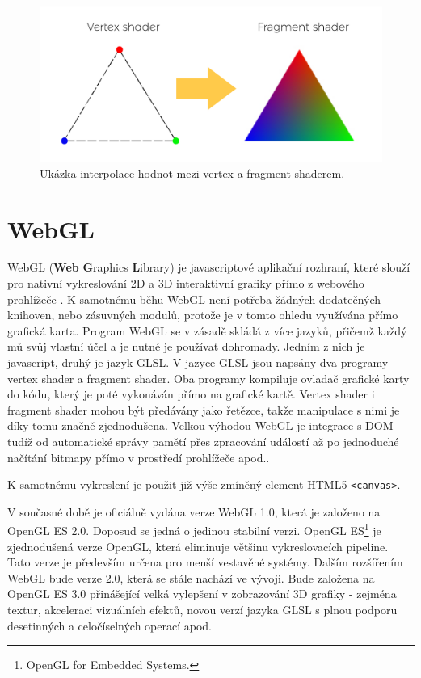  
\begin{figure}[h]
	\label{img:1}
	\centering
	\includegraphics[scale=1.0,angle=0,width=1.0\linewidth]{obrazky-figures/interpolace}
	\caption{Ukázka interpolace hodnot mezi vertex a fragment shaderem.}
	\label{fig:inter}
\end{figure}
 



\newpage

\section{WebGL}
WebGL (\textbf{Web} \textbf{G}raphics \textbf{L}ibrary) je javascriptové aplikační rozhraní, které slouží pro nativní vykreslování 2D a 3D interaktivní grafiky přímo z webového prohlížeče \cite{mozilla}. K samotnému běhu WebGL není potřeba žádných dodatečných knihoven, nebo zásuvných modulů, protože je v tomto ohledu využívána přímo grafická karta. Program WebGL se v zásadě skládá z více jazyků, přičemž každý mů svůj vlastní účel a je nutné je používat dohromady. Jedním z nich je javascript, druhý je jazyk GLSL. V jazyce GLSL jsou napsány dva programy - vertex shader a fragment shader. Oba programy kompiluje ovladač grafické karty do kódu, který je poté vykonáván přímo na grafické kartě. Vertex shader i fragment shader mohou být předávány jako řetězce, takže manipulace s nimi je díky tomu značně zjednodušena. Velkou výhodou WebGL je integrace s DOM tudíž od automatické správy pamětí přes zpracování událostí až po jednoduché načítání bitmapy přímo v prostředí prohlížeče apod..

K samotnému vykreslení je použit již výše zmíněný element HTML5 \texttt{<canvas>}.

V současné době je oficiálně vydána verze WebGL 1.0, která je založeno na OpenGL ES 2.0. Doposud se jedná o jedinou stabilní verzi. OpenGL ES\footnote{OpenGL for Embedded Systems.} je zjednodušená verze OpenGL, která eliminuje většinu vykreslovacích pipeline. Tato verze je především určena pro menší vestavěné systémy. Dalším rozšířením WebGL bude verze 2.0, která se stále nachází ve vývoji. Bude založena na OpenGL ES 3.0 přinášející velká vylepšení v zobrazování 3D grafiky - zejména textur, akceleraci vizuálních efektů, novou verzí jazyka GLSL s plnou podporu desetinných a celočíselných operací apod.

